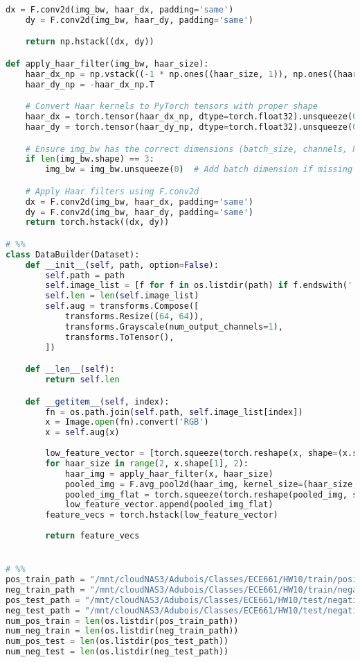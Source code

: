 \documentclass{article}
\begin{document}
\begin{lstlisting}[language=Python]
    dx = F.conv2d(img_bw, haar_dx, padding='same')
    dy = F.conv2d(img_bw, haar_dy, padding='same')

    return np.hstack((dx, dy))

def apply_haar_filter(img_bw, haar_size):
    haar_dx_np = np.vstack((-1 * np.ones((haar_size, 1)), np.ones((haar_size, 1))))
    haar_dy_np = -haar_dx_np.T

    # Convert Haar kernels to PyTorch tensors with proper shape
    haar_dx = torch.tensor(haar_dx_np, dtype=torch.float32).unsqueeze(0).unsqueeze(0)  # Shape: (1, 1, H, W)
    haar_dy = torch.tensor(haar_dy_np, dtype=torch.float32).unsqueeze(0).unsqueeze(0)  # Shape: (1, 1, H, W)

    # Ensure img_bw has the correct dimensions (batch_size, channels, height, width)
    if len(img_bw.shape) == 3:
        img_bw = img_bw.unsqueeze(0)  # Add batch dimension if missing

    # Apply Haar filters using F.conv2d
    dx = F.conv2d(img_bw, haar_dx, padding='same')
    dy = F.conv2d(img_bw, haar_dy, padding='same')
    return torch.hstack((dx, dy))

# %%
class DataBuilder(Dataset):
    def __init__(self, path, option=False):
        self.path = path
        self.image_list = [f for f in os.listdir(path) if f.endswith('.png')]
        self.len = len(self.image_list)
        self.aug = transforms.Compose([
            transforms.Resize((64, 64)),
            transforms.Grayscale(num_output_channels=1),
            transforms.ToTensor(),
        ])

    def __len__(self):
        return self.len

    def __getitem__(self, index):
        fn = os.path.join(self.path, self.image_list[index])
        x = Image.open(fn).convert('RGB')
        x = self.aug(x)
        
        low_feature_vector = [torch.squeeze(torch.reshape(x, shape=(x.shape[0], -1)))]
        for haar_size in range(2, x.shape[1], 2):
            haar_img = apply_haar_filter(x, haar_size)
            pooled_img = F.avg_pool2d(haar_img, kernel_size=(haar_size, haar_size))
            pooled_img_flat = torch.squeeze(torch.reshape(pooled_img, shape=(pooled_img.shape[0], -1)))
            low_feature_vector.append(pooled_img_flat)
        feature_vecs = torch.hstack(low_feature_vector)
        
        return feature_vecs


# %%
pos_train_path = "/mnt/cloudNAS3/Adubois/Classes/ECE661/HW10/train/positive/"
neg_train_path = "/mnt/cloudNAS3/Adubois/Classes/ECE661/HW10/train/negative/"
pos_test_path = "/mnt/cloudNAS3/Adubois/Classes/ECE661/HW10/test/negative/"
neg_test_path = "/mnt/cloudNAS3/Adubois/Classes/ECE661/HW10/test/negative/"
num_pos_train = len(os.listdir(pos_train_path))
num_neg_train = len(os.listdir(neg_train_path))
num_pos_test = len(os.listdir(pos_test_path))
num_neg_test = len(os.listdir(neg_test_path))


\end{lstlisting}
\end{document}
